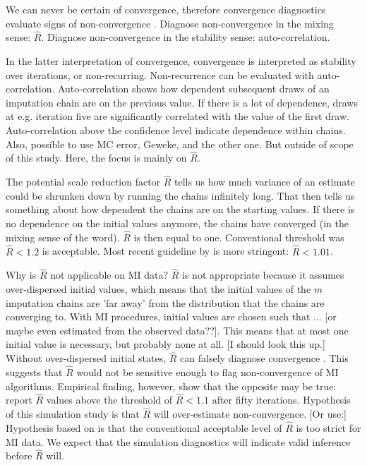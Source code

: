 \documentclass[article]{jss}
\begin{document}
We can never be certain of convergence, therefore convergence diagnostics evaluate signs of non-convergence \cite{hoff09}. %
Diagnose non-convergence in the mixing sense: $\widehat{R}$. Diagnose non-convergence in the stability sense: auto-correlation. 

In the latter interpretation of convergence, convergence is interpreted as stability over iterations, or non-recurring. Non-recurrence can be evaluated with auto-correlation. Auto-correlation shows how dependent subsequent draws of an imputation chain are on the previous value. If there is a lot of dependence, draws at e.g. iteration five are significantly correlated with the value of the first draw. Auto-correlation above the confidence level indicate dependence within chains. Also, possible to use MC error, Geweke, and the other one. But outside of scope of this study. Here, the focus is mainly on $\widehat{R}$.

The potential scale reduction factor $\widehat{R}$ tells us how much variance of an estimate could be shrunken down by running the chains infinitely long. That then tells us something about how dependent the chains are on the starting values. If there is no dependence on the initial values anymore, the chains have converged (in the mixing sense of the word). $\widehat{R}$ is then equal to one. Conventional threshold was $\widehat{R} < 1.2$ is acceptable. Most recent guideline by \cite{veht19} is more stringent: $\widehat{R} < 1.01$. 

Why is $\widehat{R}$ not applicable on MI data? $\widehat{R}$ is not appropriate because it assumes over-dispersed initial values, which means that the initial values of the $m$ imputation chains are 'far away' from the distribution that the chains are converging to. With MI procedures, initial values are chosen such that ... [or maybe even estimated from the observed data??]. This means that at most one initial value is necessary, but probably none at all. [I should look this up.] Without over-dispersed initial states, $\widehat{R}$ can falsely diagnose convergence \cite{broo98}. %
This suggests that $\widehat{R}$ would not be sensitive enough to flag non-convergence of MI algorithms. Empirical finding, however, show that the opposite may be true: \cite{lace07} report $\widehat{R}$ values above the threshold of $\widehat{R} < 1.1$ after fifty iterations. %
Hypothesis of this simulation study is that $\widehat{R}$ will over-estimate non-convergence. [Or use:] Hypothesis based on \cite{lace07} is that the conventional acceptable level of $\widehat{R}$ is too strict for MI data. We expect that the simulation diagnostics will indicate valid inference before $\widehat{R}$ will. 
\end{document}

